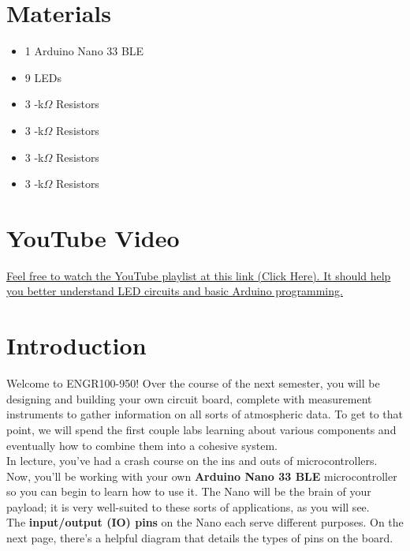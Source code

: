 \documentclass[12pt]{article}
\begin{document}
	\maketitle
	\thispagestyle{fancy}
	
	\section*{Materials}
	\begin{itemize}
		\item 1 \quad Arduino Nano 33 BLE
		\item 9 \quad LEDs
		\item 3 -k$\Omega$ Resistors
		\item 3 -k$\Omega$ Resistors
		\item 3 -k$\Omega$ Resistors
		\item 3 -k$\Omega$ Resistors
	\end{itemize}
	
	\section*{YouTube Video}
	\href{https://www.youtube.com/playlist?list=PLp2z0IQxLSvkKL0vEaFtbyeb6julsa3-8}{Feel free to watch the YouTube playlist at this link (Click Here). It should help you better understand LED circuits and basic Arduino programming.}
	
	\section*{Introduction}
    Welcome to ENGR100-950! Over the course of the next semester, you will be designing and building your own circuit board, complete with measurement instruments to gather information on all sorts of atmospheric data. To get to that point, we will spend the first couple labs learning about various components and eventually how to combine them into a cohesive system.\\
    
	In lecture, you've had a crash course on the ins and outs of microcontrollers. Now, you'll be working with your own \textbf{Arduino Nano 33 BLE} microcontroller so you can begin to learn how to use it. The Nano will be the brain of your payload; it is very well-suited to these sorts of applications, as you will see.\\
	
	The \textbf{input/output (IO) pins} on the Nano each serve different purposes. On the next page, there's a helpful diagram that details the types of pins on the board.\\
	
\end{document}

